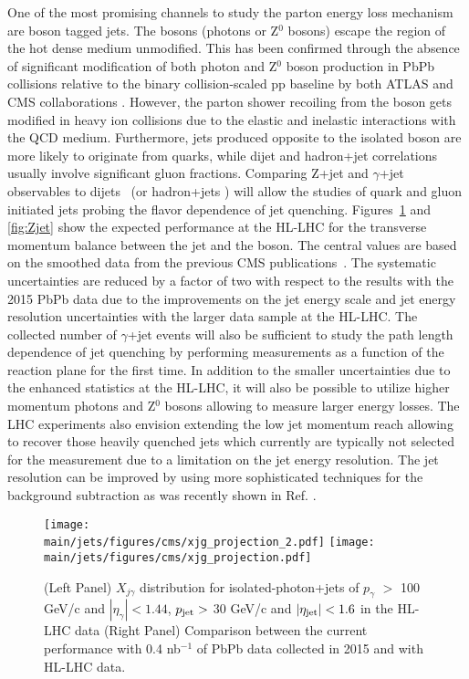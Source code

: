 One of the most promising channels to study the parton energy loss mechanism are boson tagged jets. The bosons (photons or Z$^{0}$ bosons) escape the region of the hot dense medium unmodified. This has been confirmed through the absence of significant modification of both photon and Z$^{0}$ boson production in PbPb collisions relative to the binary collision-scaled pp baseline by both ATLAS and CMS collaborations \cite{Aad:2012ew,Aad:2015lcb,Chatrchyan:2012vq,Chatrchyan:2014csa}. However, the parton shower recoiling from the boson gets modified in heavy ion collisions due to the elastic and inelastic interactions with the QCD medium. Furthermore, jets produced opposite to the isolated boson
are more likely to originate from quarks, while dijet and hadron+jet correlations usually involve significant gluon fractions. 
Comparing Z+jet and $\gamma$+jet observables to dijets~\cite{Chatrchyan:2011sx,Chatrchyan:2012nia} (or hadron+jets \cite{Adam:2015doa}) will allow the studies of quark and gluon initiated jets probing the flavor dependence of jet quenching. Figures~\ref{fig:photonjet} and \ref{fig:Zjet} show the expected performance at the HL-LHC for the transverse momentum balance between the jet and the boson. The central values are based on the smoothed data from the previous CMS publications~\cite{Sirunyan:2017jic,Sirunyan:2017qhf}. The systematic uncertainties are reduced by a factor of two with respect to the results with the 2015 PbPb data due to the improvements on the jet energy scale and jet energy resolution uncertainties with the larger data sample at the HL-LHC. The collected number of $\gamma$+jet events will also be sufficient to study the path length dependence of jet quenching by performing measurements as a function of the reaction plane for the first time. In addition to the smaller uncertainties due to the enhanced statistics at the HL-LHC, it will also be possible to utilize higher momentum photons and Z$^{0}$ bosons allowing to measure larger energy losses. The LHC experiments also envision extending the low jet momentum reach allowing to recover those heavily quenched jets which currently are typically not selected for the measurement due to a limitation on the jet energy resolution. The jet resolution can be improved by using more sophisticated techniques for the background subtraction as was recently shown in Ref. \cite{Haake:2018hqn}.

\begin{figure}[!ht]
\begin{center}
\texttt{[image: \\main/jets/figures/cms/xjg\_projection\_2.pdf]}
\texttt{[image: \\main/jets/figures/cms/xjg\_projection.pdf]}
\caption{(Left Panel) $X_{j\gamma}$ distribution for isolated-photon+jets of $p_{\gamma}$ $> $ 100 GeV/c and $|\eta_{\gamma}|<1.44$, $p_{\rm jet} > $ 30 GeV/c and $|\eta_{\rm jet}| < 1.6$ in the HL-LHC data (Right Panel) Comparison between the current performance with 0.4 nb$^{-1}$ of PbPb data collected in 2015 and with HL-LHC data. \cite{CMS-FTR-17-002:2017dec}}
\label{fig:photonjet}
\end{center}
\end{figure}

